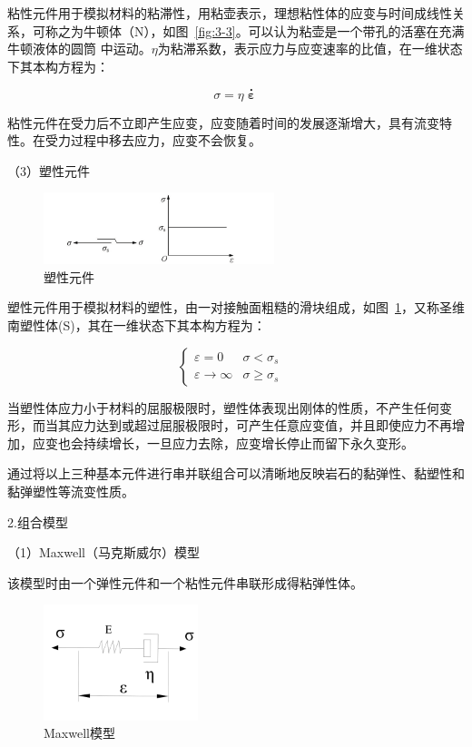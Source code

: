 粘性元件用于模拟材料的粘滞性，用粘壶表示，理想粘性体的应变与时间成线性关系，可称之为牛顿体（N），如图~\ref{fig:3-3}。可以认为粘壶是一个带孔的活塞在充满牛顿液体的圆筒
中运动。$\eta$为粘滞系数，表示应力与应变速率的比值，在一维状态下其本构方程为：

\begin{equation}
{\sigma}={\eta}\overset{\centerdot }{\mathop{\boldsymbol{\varepsilon}}}
\end{equation}

粘性元件在受力后不立即产生应变，应变随着时间的发展逐渐增大，具有流变特性。在受力过程中移去应力，应变不会恢复。

（3）塑性元件
\begin{figure}[ht!]
    \centering
            \centering
            \includegraphics[width=0.6\textwidth]{img/chap3/Plastic element.png}
    \caption{塑性元件}
    \label{fig:3-4}
\end{figure}

塑性元件用于模拟材料的塑性，由一对接触面粗糙的滑块组成，如图~\ref{fig:3-4}，又称圣维南塑性体(S)，其在一维状态下其本构方程为：

\begin{equation}
    \left\{\begin{matrix}
               \varepsilon =0& \sigma <{{\sigma }_{s}} & \\
               \varepsilon \to \infty & \sigma \ge {{\sigma }_{s}}  &
    \end{matrix}\right.
\end{equation}

当塑性体应力小于材料的屈服极限时，塑性体表现出刚体的性质，不产生任何变形，而当其应力达到或超过屈服极限时，可产生任意应变值，并且即使应力不再增加，应变也会持续增长，一旦应力去除，应变增长停止而留下永久变形。

通过将以上三种基本元件进行串并联组合可以清晰地反映岩石的黏弹性、黏塑性和
黏弹塑性等流变性质。

2.组合模型

（1）Maxwell（马克斯威尔）模型

该模型时由一个弹性元件和一个粘性元件串联形成得粘弹性体。
\begin{figure}[ht!]
    \centering
            \centering
            \includegraphics[width=0.4\textwidth]{img/chap3/Maxwell.png}
    \caption{Maxwell模型}
    \label{fig:3-5}
\end{figure}

